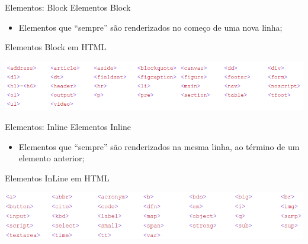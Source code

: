 \documentclass{beamer}
\begin{document}
\begin{frame}{Elementos: Block}
  Elementos Block
     \begin{itemize}
      \item Elementos que “sempre” são renderizados no começo de
uma nova linha;
     \end{itemize}
 
 Elementos Block em HTML
  \vspace{0.3cm}
 \begin{center}
     \includegraphics[height=0.18\paperheight]{fig/aula2/html12.png}
   \end{center}

\end{frame}
\begin{frame}{Elementos: Inline}
  Elementos Inline
     \begin{itemize}
      \item Elementos que “sempre” são renderizados na mesma linha,
ao término de um elemento anterior;
     \end{itemize}
 
 Elementos InLine em HTML
 \vspace{0.3cm}
 \begin{center}
     \includegraphics[height=0.18\paperheight]{fig/aula2/html13.png}
   \end{center}
\end{frame}
\end{document}

